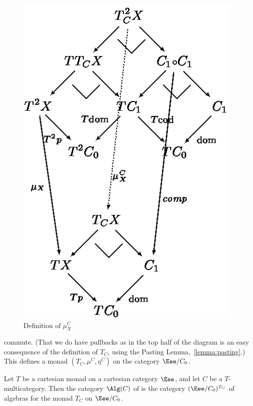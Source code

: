 \begin{figure}
\hspace{10em}\includegraphics{mudiagram.eps}
\caption{Definition of $\mu^C_X$}
\label{fig:mu-diag}
\end{figure}
% 
commute.  (That we do have pullbacks as in the top half of the diagram is
an easy consequence of the definition of $T_C$, using the Pasting
Lemma,~\ref{lemma:pasting}.)  This defines a monad $(T_C, \mu^C,
\eta^C)$%
% 
% 
on the category $\Eee/C_0$. 

\begin{defn}%
%
%
%
%
Let $T$ be a cartesian monad on a cartesian category $\Eee$, and let $C$ be
a $T$-multicategory.  Then the category $\Alg(C)$%
% 
% 
of  is the category $(\Eee/C_0)^{T_C}$ of algebras for the monad $T_C$ on
$\Eee/C_0$.
\end{defn}


